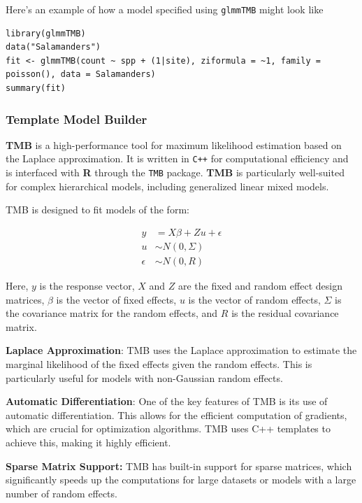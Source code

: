 \documentclass[12pt, twoside,hidelinks]{article}
\theoremstyle{definition}
\numberwithin{equation}{section}
\begin{document}
Here's an example of how a model specified using \texttt{glmmTMB} might look like

\begin{verbatim}
library(glmmTMB)
data("Salamanders")
fit <- glmmTMB(count ~ spp + (1|site), ziformula = ~1, family = poisson(), data = Salamanders)
summary(fit)
\end{verbatim}


\subsubsection{Template Model Builder}

\textbf{TMB} is a high-performance tool for maximum likelihood estimation based on the Laplace approximation. It is written in \texttt{C++} for computational efficiency and is interfaced with \textbf{R} through the \texttt{TMB} package. \textbf{TMB} is particularly well-suited for complex hierarchical models, including generalized linear mixed models.
\newline

TMB is designed to fit models of the form:

\[
\begin{aligned}
y &= X\beta + Z u + \epsilon \\
u &\sim N(0, \Sigma) \\
\epsilon &\sim N(0, R)
\end{aligned}
\]

Here, \(y\) is the response vector, \(X\) and \(Z\) are the fixed and random effect design matrices, \(\beta\) is the vector of fixed effects, \(u\) is the vector of random effects, \(\Sigma\) is the covariance matrix for the random effects, and \(R\) is the residual covariance matrix.
\newline

\textbf{Laplace Approximation}: TMB uses the Laplace approximation to estimate the marginal likelihood of the fixed effects given the random effects. This is particularly useful for models with non-Gaussian random effects.
\newline

\textbf{Automatic Differentiation}: One of the key features of TMB is its use of automatic differentiation. This allows for the efficient computation of gradients, which are crucial for optimization algorithms. TMB uses C++ templates to achieve this, making it highly efficient.
\newline

\textbf{Sparse Matrix Support:} TMB has built-in support for sparse matrices, which significantly speeds up the computations for large datasets or models with a large number of random effects.
\newline
\end{document}
